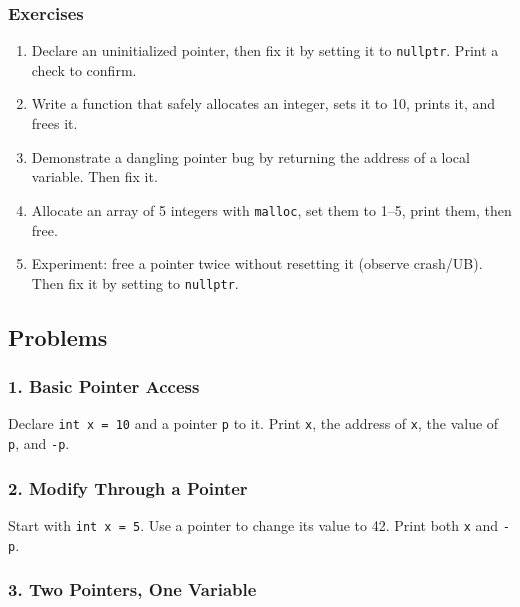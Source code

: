 \documentclass[
  letterpaper,
  DIV=11,
  numbers=noendperiod]{scrreprt}
\providecommand{\tightlist}{%
  \setlength{\itemsep}{0pt}\setlength{\parskip}{0pt}}
\begin{document}
\subsubsection{Exercises}\label{exercises-34}

\begin{enumerate}
\def\labelenumi{\arabic{enumi}.}
\tightlist
\item
  Declare an uninitialized pointer, then fix it by setting it to
  \texttt{nullptr}. Print a check to confirm.
\item
  Write a function that safely allocates an integer, sets it to 10,
  prints it, and frees it.
\item
  Demonstrate a dangling pointer bug by returning the address of a local
  variable. Then fix it.
\item
  Allocate an array of 5 integers with \texttt{malloc}, set them to
  1--5, print them, then free.
\item
  Experiment: free a pointer twice without resetting it (observe
  crash/UB). Then fix it by setting to \texttt{nullptr}.
\end{enumerate}

\subsection{Problems}\label{problems-5}

\subsubsection{1. Basic Pointer Access}\label{basic-pointer-access}

Declare \texttt{int\ x\ =\ 10} and a pointer \texttt{p} to it. Print
\texttt{x}, the address of \texttt{x}, the value of \texttt{p}, and
\texttt{-p}.

\subsubsection{2. Modify Through a
Pointer}\label{modify-through-a-pointer}

Start with \texttt{int\ x\ =\ 5}. Use a pointer to change its value to
42. Print both \texttt{x} and \texttt{-p}.

\subsubsection{3. Two Pointers, One
Variable}\label{two-pointers-one-variable}
\end{document}
